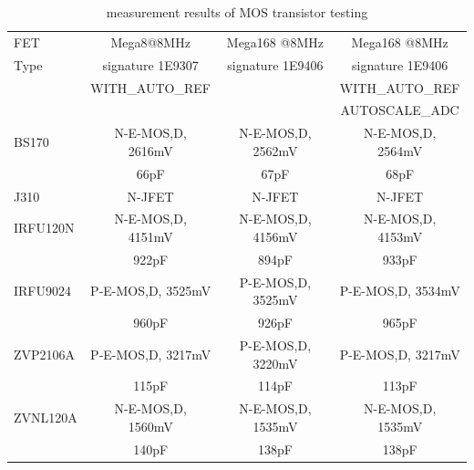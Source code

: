 \begin{table}[H]
  \begin{center}
    \begin{tabular}{| l | c | c | c |}
    \hline
     FET & Mega8@8MHz & Mega168 @8MHz & Mega168 @8MHz \\
    Type    & signature 1E9307 & signature 1E9406 & signature 1E9406 \\
           & WITH\_AUTO\_REF &  & WITH\_AUTO\_REF \\
           &                 &  & AUTOSCALE\_ADC \\
    \hline
    \hline
BS170 & N-E-MOS,D, 2616mV & N-E-MOS,D, 2562mV & N-E-MOS,D, 2564mV \\
      &  66pF             &  67pF  &  68pF \\
    \hline
J310 & N-JFET & N-JFET & N-JFET\\
    \hline
IRFU120N & N-E-MOS,D, 4151mV & N-E-MOS,D, 4156mV & N-E-MOS,D, 4153mV\\
     & 922pF  & 894pF  & 933pF \\
    \hline
IRFU9024 & P-E-MOS,D, 3525mV & P-E-MOS,D, 3525mV & P-E-MOS,D, 3534mV\\
     & 960pF & 926pF & 965pF \\
    \hline
ZVP2106A & P-E-MOS,D, 3217mV & P-E-MOS,D, 3220mV & P-E-MOS,D, 3217mV\\
  & 115pF & 114pF & 113pF \\
    \hline
ZVNL120A & N-E-MOS,D, 1560mV & N-E-MOS,D, 1535mV & N-E-MOS,D, 1535mV \\
  & 140pF & 138pF  & 138pF \\
    \hline
    \end{tabular}
  \end{center}
  \caption{measurement results of MOS transistor testing}
  \label{tab:mos} 
\end{table}

